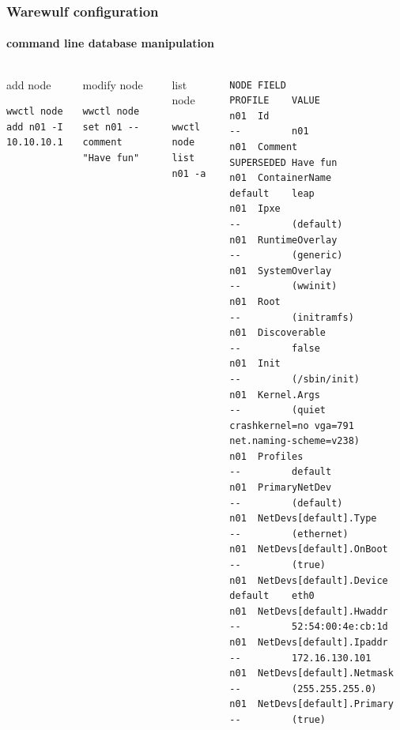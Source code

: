 \documentclass[aspectratio=169]{beamer}
\begin{document}
\begin{frame}[fragile]
\frametitle{Warewulf configuration}
\framesubtitle{command line database manipulation}
\begin{columns}
\begin{block}{add node}
\begin{lstlisting}[style=wwctl]
wwctl node add n01 -I 10.10.10.1
\end{lstlisting}
\end{block}
\begin{block}{modify node}
\begin{lstlisting}[style=wwctl]
wwctl node set n01 --comment "Have fun"
\end{lstlisting}
\end{block}
\begin{block}{list node}
\begin{lstlisting}[style=wwctl]
wwctl node list n01 -a
\end{lstlisting}
\end{block}
\vspace*{3cm}
\begin{lstlisting}[style=mystyle]
NODE FIELD                    PROFILE    VALUE
n01  Id                       --         n01
n01  Comment                  SUPERSEDED Have fun
n01  ContainerName            default    leap
n01  Ipxe                     --         (default)
n01  RuntimeOverlay           --         (generic)
n01  SystemOverlay            --         (wwinit)
n01  Root                     --         (initramfs)
n01  Discoverable             --         false
n01  Init                     --         (/sbin/init)
n01  Kernel.Args              --         (quiet crashkernel=no vga=791 net.naming-scheme=v238)
n01  Profiles                 --         default
n01  PrimaryNetDev            --         (default)
n01  NetDevs[default].Type    --         (ethernet)
n01  NetDevs[default].OnBoot  --         (true)
n01  NetDevs[default].Device  default    eth0
n01  NetDevs[default].Hwaddr  --         52:54:00:4e:cb:1d
n01  NetDevs[default].Ipaddr  --         172.16.130.101
n01  NetDevs[default].Netmask --         (255.255.255.0)
n01  NetDevs[default].Primary --         (true)
\end{lstlisting}
\end{columns}
\end{frame}
\end{document}
